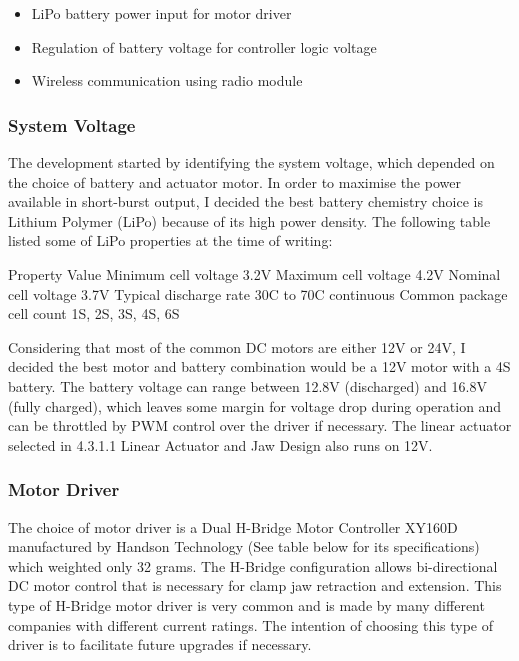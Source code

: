 \begin{itemize}
    \item LiPo battery power input for motor driver
    \item Regulation of battery voltage for controller logic voltage
    \item Wireless communication using radio module
\end{itemize}

\subsubsection{System Voltage}
\label{subsubsection:exploration-1-system-voltage}

The development started by identifying the system voltage, which depended on the choice of battery and actuator motor. In order to maximise the power available in short-burst output, I decided the best battery chemistry choice is Lithium Polymer (LiPo) because of its high power density. The following table listed some of LiPo properties at the time of writing:

Property
Value
Minimum cell voltage
3.2V
Maximum cell voltage
4.2V
Nominal cell voltage
3.7V
Typical discharge rate
30C to 70C continuous
Common package cell count
1S, 2S, 3S, 4S, 6S

Considering that most of the common DC motors are either 12V or 24V, I decided the best motor and battery combination would be a 12V motor with a 4S battery. The battery voltage can range between 12.8V (discharged) and 16.8V (fully charged), which leaves some margin for voltage drop during operation and can be throttled by PWM control over the driver if necessary. The linear actuator selected in 4.3.1.1 Linear Actuator and Jaw Design also runs on 12V.

\subsubsection{Motor Driver}
\label{subsubsection:exploration-1-motor-driver}

The choice of motor driver is a Dual H-Bridge Motor Controller XY160D manufactured by Handson Technology (See table below for its specifications) which weighted only 32 grams. The H-Bridge configuration allows bi-directional DC motor control that is necessary for clamp jaw retraction and extension. This type of H-Bridge motor driver is very common and is made by many different companies with different current ratings. The intention of choosing this type of driver is to facilitate future upgrades if necessary. 

